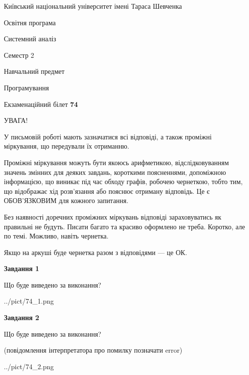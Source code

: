 \documentclass[12pt, ukrainian]{article}
\begin{document}
{{\begin {small}\par
{ \center  Київський національний університет імені Тараса Шевченка \par}
{\parbox {5 cm}{Освітня програма \hfill}{\parbox {7 cm}{Системний аналіз \hfill}}\parbox {6 cm}{\hfill Семестр 2}}\par
{\parbox {5 cm} {Навчальний предмет \hfill}\parbox {7 cm}{Програмування \hfill}\parbox {6cm}{\hfill}\par}\vspace{-7pt} \end{small}}{\center Екзаменаційний білет \No \textbf
{ 74 }\par}}
{
\begin {large}
УВАГА!

У письмовій роботі мають зазначатися всі відповіді, а також проміжні міркування, що передували їх отриманню.

Проміжні міркування можуть бути якоюсь арифметикою, відслідковуванням зна\-чень змінних для деяких завдань,
короткими поясненнями, допоміжною інформацією, що виникає під час обходу графів, робочею чернеткою,
тобто тим, що відображає хід розв’язання або пояснює отриману відповідь.
Це є ОБОВ’ЯЗКОВИМ для кожного запитання.

Без наявності доречних проміжних міркувань відповіді зараховуватись як правиль\-ні не будуть.
Писати багато та красиво оформлено не треба. Коротко, але по темі. Можли\-во, навіть чернетка.

Якщо на аркуші буде чернетка разом з відповідями --- це ОК.

\newpage

{\begin {center}\textbf{Завдання 1}\end {center}}\par
Що буде виведено за виконання?\par
\begin{center}
	{../pict/74_1.png}
\end{center}
\newpage

{\begin {center}\textbf{Завдання 2}\end {center}}\par
Що буде виведено за виконання?\par
 (повідомлення інтерпретатора про помилку позначати error)\par
\begin{center}
	{../pict/74_2.png}
\end{center}
\newpage


\end{large}}
\end{document}
